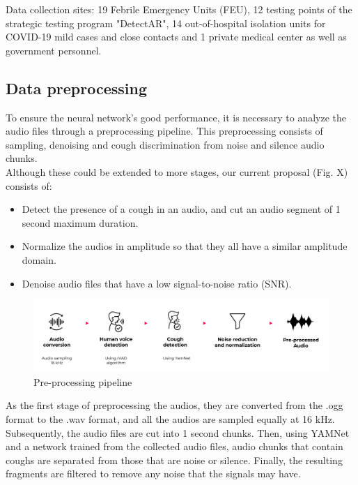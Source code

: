 \documentclass{nle}
\begin{document}
Data collection sites:  19 Febrile Emergency Units (FEU), 12 testing points of the strategic testing program "DetectAR", 14 out-of-hospital isolation units for COVID-19 mild cases and close contacts and 1 private medical center as well as government personnel.

\subsection{Data preprocessing}

To ensure the neural network’s good performance, it is necessary to analyze the audio files through a preprocessing pipeline. This preprocessing consists of sampling, denoising and cough discrimination from noise and silence audio chunks.\\

Although these could be extended to more stages, our current proposal (Fig. X) consists of:
\begin{itemize}
    \item Detect the presence of a cough in an audio, and cut an audio segment of 1 second maximum duration.
    \item Normalize the audios in amplitude so that they all have a similar amplitude domain.
    \item Denoise audio files that have a low signal-to-noise ratio (SNR).
\end{itemize}

\begin{figure}[htp]
    \centering
    \includegraphics[width=12cm]{PREPROSSECING}
    \caption{Pre-processing pipeline}
    \label{fig:prepro}
\end{figure}

As the first stage of preprocessing the audios, they are converted from the .ogg format to the .wav format, and all the audios are sampled equally at 16 kHz.\\

Subsequently, the audio files are cut into 1 second chunks. Then, using YAMNet and a network trained from the collected audio files, audio chunks that contain coughs are separated from those that are noise or silence. Finally, the resulting fragments are filtered to remove any noise that the signals may have.\\
\end{document}
